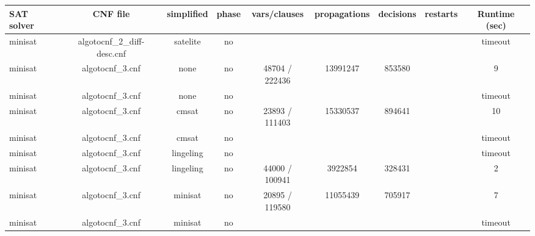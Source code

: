 \begin{appendices}
\begin{table}[p]
  \begin{center}
    \begin{tabular}{l|cccccccc}
        \textbf{SAT solver} & \textbf{CNF file} & \textbf{simplified} & \textbf{phase} & \textbf{vars/clauses} & \textbf{propagations} & \textbf{decisions} & \textbf{restarts} & \textbf{Runtime (sec)} \\
      \hline
  minisat                        & algotocnf\_2\_diff-desc.cnf    & satelite   & no    &            &           &           &            & timeout \\ %
  minisat                        & algotocnf\_3.cnf               & none       & no    & 48704 / 222436 & 13991247  & 853580    &            & 9 \\ %
  minisat                        & algotocnf\_3.cnf               & none       & no    &            &           &           &            & timeout \\ %
  minisat                        & algotocnf\_3.cnf               & cmsat      & no    & 23893 / 111403 & 15330537  & 894641    &            & 10 \\ %
  minisat                        & algotocnf\_3.cnf               & cmsat      & no    &            &           &           &            & timeout \\ %
  minisat                        & algotocnf\_3.cnf               & lingeling  & no    &            &           &           &            & timeout \\ %
  minisat                        & algotocnf\_3.cnf               & lingeling  & no    & 44000 / 100941 & 3922854   & 328431    &            & 2 \\ %
  minisat                        & algotocnf\_3.cnf               & minisat    & no    & 20895 / 119580 & 11055439  & 705917    &            & 7 \\ %
  minisat                        & algotocnf\_3.cnf               & minisat    & no    &            &           &           &            & timeout \\ %

\end{tabular}
\end{center}
\end{table}
\end{appendices}
